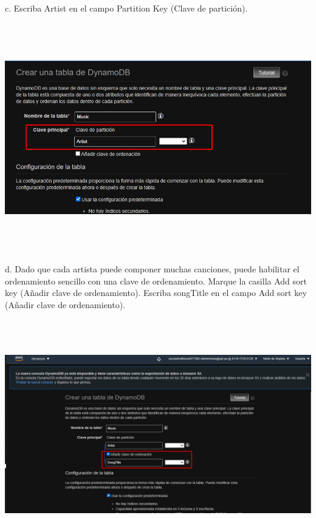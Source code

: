 \documentclass[12pt,letterpaper]{article}
\begin{document}
c. Escriba Artist en el campo Partition Key (Clave de partición).
\begin{center}
    \includegraphics[width=18cm, height=10cm]{img/4.png}  
\end{center}

d. Dado que cada artista puede componer muchas canciones, puede habilitar el ordenamiento sencillo con una clave de ordenamiento. Marque la casilla Add sort key (Añadir clave de ordenamiento). Escriba songTitle en el campo Add sort key (Añadir clave de ordenamiento).
\begin{center}
    \includegraphics[width=18cm, height=10cm]{img/d.png}  
\end{center}
\end{document}
